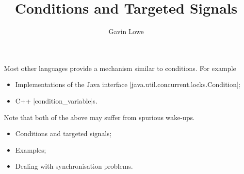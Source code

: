 \documentclass[notes,color]{sepslide0}
\title{Conditions and Targeted Signals}
\author{Gavin Lowe}
\begin{document}
\begin{slide}
  
  \Title

\end{slide}


%



\begin{slide}

Most other languages provide a mechanism similar to conditions.  For example
%
\begin{itemize}
\item Implementations of the Java interface
  |java.util.concurrent.locks.Condition|;

\item C++ |condition_variable|s.
\end{itemize}
%
Note that both of the above may suffer from spurious wake-ups.
\end{slide}


\begin{slide}

\begin{itemize}
\item Conditions and targeted signals;

\item Examples;

\item Dealing with synchronisation problems.
\end{itemize}
\end{slide}
\end{document}
